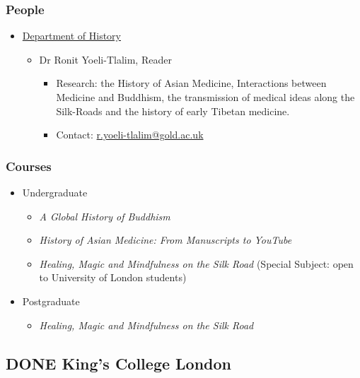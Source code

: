 \documentclass[11pt]{article}
\begin{document}
\subsubsection*{People}
\label{sec:orgd9da1bf}
\begin{itemize}
\item \href{https://www.gold.ac.uk/history/}{Department of History}
\label{sec:org5cce3a1}
\begin{itemize}
\item Dr Ronit Yoeli-Tlalim, Reader
\label{sec:org679ab5d}
\begin{itemize}
\item Research: the History of Asian Medicine, Interactions between Medicine and Buddhism, the transmission of medical ideas along the Silk-Roads and the history of early Tibetan medicine.\\
\item Contact: \href{mailto:r.yoeli-tlalim@gold.ac.uk}{r.yoeli-tlalim@gold.ac.uk}\\
\end{itemize}
\end{itemize}
\end{itemize}
\subsubsection*{Courses}
\label{sec:orgb3bd4ad}
\begin{itemize}
\item Undergraduate
\label{sec:org2293965}
\begin{itemize}
\item \emph{A Global History of Buddhism}\\
\item \emph{History of Asian Medicine: From Manuscripts to YouTube}\\
\item \emph{Healing, Magic and Mindfulness on the Silk Road} (Special Subject: open to University of London students)\\
\end{itemize}
\item Postgraduate
\label{sec:orgcd30dc2}
\begin{itemize}
\item \emph{Healing, Magic and Mindfulness on the Silk Road}\\
\end{itemize}
\end{itemize}
\subsection*{{\bfseries\sffamily DONE} King's College London}
\label{sec:org4e677a7}
\end{document}
